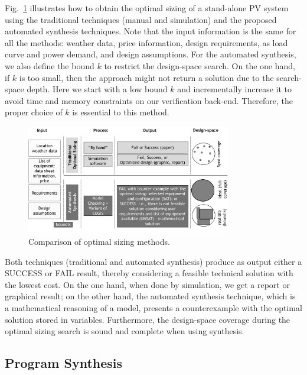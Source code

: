 \documentclass[runningheads]{llncs}
\begin{document}
Fig.~\ref{fig:optimization} illustrates how to obtain the optimal sizing of a stand-alone PV system using the traditional techniques (manual and simulation) and the proposed automated synthesis techniques. Note that the input information is the same for all the methods: weather data, price information, design requirements, as load curve and power demand, and design assumptions. For the automated synthesis, we also define the bound $k$ to restrict the design-space search. On the one hand, if $k$ is too small, then the approach might not return a solution due to the search-space depth. Here we start with a low bound $k$ and incrementally increase it to avoid time and memory constraints on our verification back-end. Therefore, the proper choice of $k$ is essential to this method.
%
\begin{figure}[h]
\includegraphics[width=0.8\textwidth]{optimalsizingprocess3}
\centering
\caption{Comparison of optimal sizing methods.}
\label{fig:optimization}
\end{figure}

Both techniques (traditional and automated synthesis)  produce as output either a SUCCESS or FAIL result, thereby considering a feasible technical solution with the lowest cost. On the one hand, when done by simulation, we get a report or graphical result; on the other hand, the automated synthesis technique, which is a mathematical reasoning of a model, presents a counterexample with the optimal solution stored in variables. Furthermore, the design-space coverage during the optimal sizing search is sound and complete when using synthesis.

\subsection{Program Synthesis}
\label{sec:ProgramSynthesis}
\end{document}
